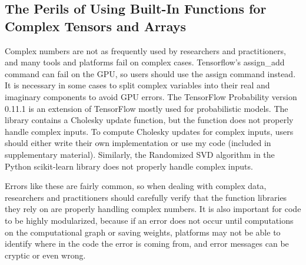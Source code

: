 \subsection{The Perils of Using Built-In Functions for Complex Tensors and Arrays}
Complex numbers are not as frequently used by researchers and practitioners, and many tools and platforms fail on complex cases.  Tensorflow's assign\_add command can fail on the GPU, so users should use the assign command instead. It is necessary in some cases to split complex variables into their real and imaginary components to avoid GPU errors. 
The TensorFlow Probability version 0.11.1 \cite{tensorflowprobability} is an extension of TensorFlow mostly used for probabilistic models. The library contains a Cholesky update function, but the function does not properly handle complex inputs. To compute Cholesky updates for complex inputs, users should either write their own implementation or use my code (included in supplementary material). Similarly, the Randomized SVD algorithm in the Python scikit-learn library does not properly handle complex inputs.

Errors like these are fairly common, so when dealing with complex data, researchers and practitioners should carefully verify that the function libraries they rely on are properly handling complex numbers. It is also important for code to be highly modularized, because if an error does not occur until computations on the computational graph or saving weights, platforms may not be able to identify where in the code the error is coming from, and error messages can be cryptic or even wrong.
